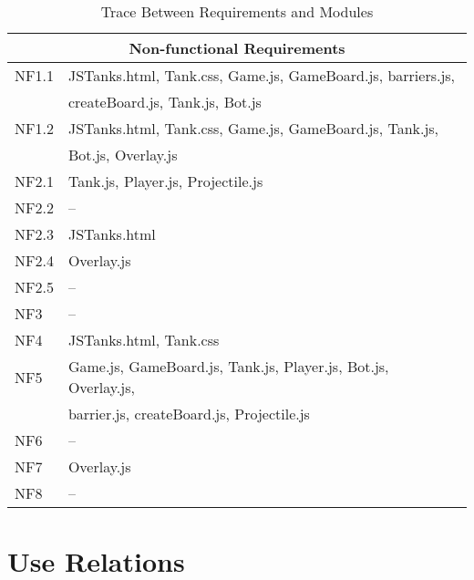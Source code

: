 \documentclass{article}
\begin{document}
\begin{table}[!htbp]
\begin{tabular}{ll}
        \midrule
        \multicolumn{2}{c}{Non-functional Requirements} \\
        \midrule
        NF1.1 & JSTanks.html, Tank.css, Game.js, GameBoard.js, barriers.js,\\
                     & createBoard.js, Tank.js, Bot.js \\
        NF1.2 & JSTanks.html, Tank.css, Game.js, GameBoard.js, Tank.js, \\
                     & Bot.js, Overlay.js \\
        NF2.1 & Tank.js, Player.js, Projectile.js \\
        NF2.2 & -- \\
        NF2.3 & JSTanks.html \\
        NF2.4& Overlay.js \\
        NF2.5 & -- \\
        NF3 & -- \\
        NF4 &JSTanks.html, Tank.css \\
        NF5 & Game.js, GameBoard.js, Tank.js, Player.js, Bot.js, Overlay.js, \\
                 &barrier.js, createBoard.js, Projectile.js \\
        NF6 & -- \\
        NF7 & Overlay.js \\
        NF8 & -- \\
        \bottomrule
        \end{tabular}
        \caption{Trace Between Requirements and Modules}
        \makeatletter
           \def\rulecolor#1#{\CT@arc{#1}}
           \def\CT@arc#1#2{%
           \ifdim\baselineskip=\z@\noalign\fi
           {\gdef\CT@arc@{\color#1{#2}}}}
           \let\CT@arc@\relax
        \makeatother
        \label{Table 2}
        \end{table}
\section{Use Relations}

\newpage
\listoftables
\listoffigures
\end{document}
